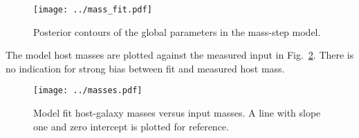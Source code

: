 \documentclass{aastex61}   	%
\begin{document}
\begin{figure}[htbp] %
   \centering
   \texttt{[image: ../mass\_fit.pdf]}
   \caption{Posterior contours of the global parameters in the mass-step model.
   \label{mass_fit:fig}}
\end{figure}

The  model host masses are plotted  against the measured input in  Fig.~\ref{masses:fig}.
There is no indication for strong bias between fit and measured host mass.

\begin{figure}[htbp] %
   \centering
   \texttt{[image: ../masses.pdf]}
   \caption{Model fit host-galaxy masses versus input masses.  A line with slope one and zero intercept is plotted for reference.
   \label{masses:fig}}
\end{figure}




\end{document}
